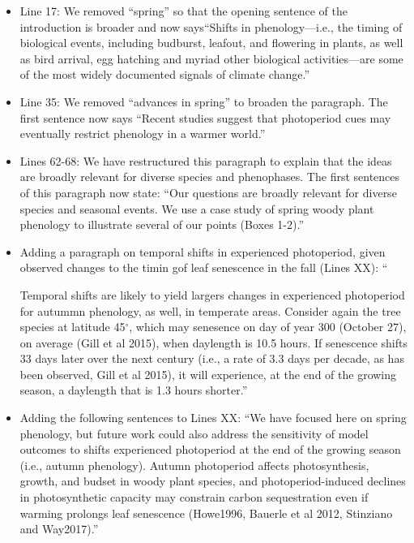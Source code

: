 \documentclass{article}
\begin{document}
\begin{itemize}
\item Line 17: We removed ``spring'' so that the opening sentence of the introduction is broader and now says``Shifts in phenology---i.e., the timing of biological events, including budburst, leafout, and flowering in plants, as well as bird arrival, egg hatching and myriad other biological activities---are some of the most widely documented signals of climate change.''
\item Line 35: We removed ``advances in spring'' to broaden the paragraph. The first sentence now says ``Recent studies suggest that photoperiod cues may eventually restrict phenology in a warmer world.''
\item Lines 62-68: We have restructured this paragraph to explain that the ideas are broadly relevant for diverse species and phenophases. The first sentences of this paragraph now state: ``Our questions are broadly relevant for diverse species and seasonal events. We use a case study of spring woody plant phenology to illustrate several of our points (Boxes 1-2).''  
\item Adding a paragraph on temporal shifts in experienced photoperiod, given observed changes to the timin gof leaf senescence in the fall (Lines XX): ``\par Temporal shifts are likely to yield largers changes in experienced photoperiod for autummn phenology, as well, in temperate areas. Consider again the tree species at latitude 45$^{\circ}$, which may senesence on day of year 300 (October 27), on average (Gill et al 2015), when daylength is 10.5 hours. If senescence shifts 33 days later over the next century (i.e., a rate of 3.3 days per decade, as has been observed, Gill et al 2015), it will experience, at the end of the growing season, a daylength that is 1.3 hours shorter.''
\item Adding the following sentences to Lines XX: ``We have focused here on spring phenology, but future work could also address the sensitivity of model outcomes to shifts experienced photoperiod at the end of the growing season (i.e., autumn phenology). Autumn photoperiod affects photosynthesis, growth, and budset in woody plant species, and photoperiod-induced declines in photosynthetic capacity may constrain carbon sequestration even if warming prolongs leaf senescence (Howe1996, Bauerle et al 2012, Stinziano and Way2017).''


\end{itemize}
\end{document}
